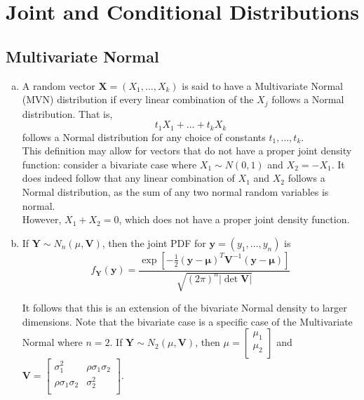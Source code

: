 \newpage

\section{Joint and Conditional Distributions}

\subsection{Multivariate Normal}

\begin{enumerate}[a)]
    \item A random vector $\mathbf{X} = (X_1, \dots, X_k)$ is said to have a Multivariate Normal (MVN) distribution if every
    linear combination of the $X_j$ follows a Normal distribution. That is,
    \[
        t_1 X_1 + \dots + t_k X_k 
    \]
    follows a Normal distribution for any choice of constants $t_1, \dots, t_k$. \\

    This definition may allow for vectors that do not have a proper joint density function: consider a bivariate case where $X_1 \sim N(0, 1)$ and $X_2 = -X_1$. It does indeed follow that any
    linear combination of $X_1$ and $X_2$ follows a Normal distribution, as the sum of any two normal random variables is normal. \\

    However, $X_1 + X_2 = 0$, which does not have a proper joint density function.

    \item If $\mathbf{Y} \sim N_n(\mu, \mathbf{V})$, then the joint PDF for $\mathbf{y} = (y_1, \dots, y_n)$ is
    \[
        f_{\mathbf{Y}}(\mathbf{y}) = \frac{\exp \left[ -\frac{1}{2}(\mathbf{y} -\mathbf{\mu})^T \mathbf{V}^{-1} (\mathbf{y} - \mathbf{\mu}) \right]}{\sqrt{(2\pi )^n |\det \mathbf{V}|}}
    \]

    It follows that this is an extension of the bivariate Normal density to larger dimensions. Note that the bivariate case is a specific case of the Multivariate Normal where $n = 2$.
    If $\mathbf{Y} \sim N_2(\mu, \mathbf{V})$, then $\mu = \begin{bmatrix}
        \mu_1 \\
        \mu_2 \\
    \end{bmatrix}$ and $\mathbf{V} = \begin{bmatrix}
        \sigma_1^2 & \rho \sigma_1\sigma_2   \\
        \rho \sigma_1\sigma_2 & \sigma_2^2  \\
    \end{bmatrix}$. \\


\end{enumerate}

